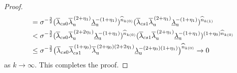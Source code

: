 \documentclass[10pt,a4paper]{amsart}
\def\ol{\overline}
\def\ru{{\mathrm{u}}}
\def\ul{\underline}
\begin{document}
\begin{proof}
\begin{align*}
&= 
\sigma^{-\frac32}
(\ol\lambda_{\rm cs0}\ol\lambda_{\mathrm{u}}^{\,(2+\eta_{1})}\ul\lambda_{\ru}^{-(1+\eta_1)})^{\widehat n_{k(0)}}(\ol\lambda_{\rm cs1}\ol\lambda_{\mathrm{u}}^{\,(2+\eta_{1})}\ul\lambda_{\ru}^{-(1+\eta_1)})^{\widehat n_{k(1)}}\\
&<
\sigma^{-\frac32}
(\ol\lambda_{\rm cs0}\ol\lambda_{\mathrm{u}}^{\,(2+2\eta_{1})}\ul\lambda_{\ru}^{-(1+\eta_1)})^{\widehat n_{k(0)}}(\ol\lambda_{\rm cs1}\ol\lambda_{\mathrm{u}}^{\,(2+\eta_{1})}\ul\lambda_{\ru}^{-(1+\eta_1)})^{(1+\eta_0)\widehat n_{k(0)}}\\
&\leq 
\sigma^{-\frac32}
\bigl(\ol\lambda_{\rm cs0}\ol\lambda_{\rm cs1}^{\,(1+\eta_0)}\ol\lambda_{\mathrm{u}}^{\,(2+\eta_0)(2+2\eta_{1})}\ul\lambda_{\ru}^{-(2+\eta_0)(1+\eta_1)}\bigr)^{\widehat n_{k(0)}}\rightarrow 0
\end{align*}
as $k\rightarrow \infty$.
This completes the proof.
\end{proof}
\end{document}
